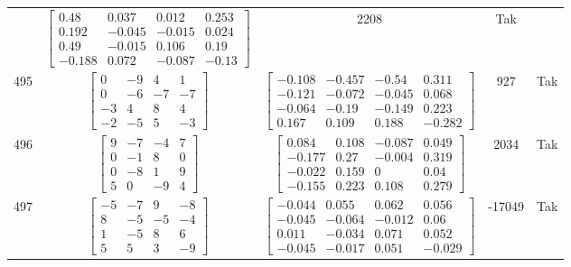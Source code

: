 \documentclass[a4paper,12pt]{article}
\begin{document}
\begin{tabular}{c c c c c}
&
$\begin{bmatrix} 0.48 & 0.037 & 0.012 & 0.253 \\ 0.192 & -0.045 & -0.015 & 0.024 \\ 0.49 & -0.015 & 0.106 & 0.19 \\ -0.188 & 0.072 & -0.087 & -0.13 \end{bmatrix}$
&
2208
&
Tak
\\
495
&
$\begin{bmatrix} 0 & -9 & 4 & 1 \\ 0 & -6 & -7 & -7 \\ -3 & 4 & 8 & 4 \\ -2 & -5 & 5 & -3 \end{bmatrix}$
&
$\begin{bmatrix} -0.108 & -0.457 & -0.54 & 0.311 \\ -0.121 & -0.072 & -0.045 & 0.068 \\ -0.064 & -0.19 & -0.149 & 0.223 \\ 0.167 & 0.109 & 0.188 & -0.282 \end{bmatrix}$
&
927
&
Tak
\\
496
&
$\begin{bmatrix} 9 & -7 & -4 & 7 \\ 0 & -1 & 8 & 0 \\ 0 & -8 & 1 & 9 \\ 5 & 0 & -9 & 4 \end{bmatrix}$
&
$\begin{bmatrix} 0.084 & 0.108 & -0.087 & 0.049 \\ -0.177 & 0.27 & -0.004 & 0.319 \\ -0.022 & 0.159 & 0 & 0.04 \\ -0.155 & 0.223 & 0.108 & 0.279 \end{bmatrix}$
&
2034
&
Tak
\\
497
&
$\begin{bmatrix} -5 & -7 & 9 & -8 \\ 8 & -5 & -5 & -4 \\ 1 & -5 & 8 & 6 \\ 5 & 5 & 3 & -9 \end{bmatrix}$
&
$\begin{bmatrix} -0.044 & 0.055 & 0.062 & 0.056 \\ -0.045 & -0.064 & -0.012 & 0.06 \\ 0.011 & -0.034 & 0.071 & 0.052 \\ -0.045 & -0.017 & 0.051 & -0.029 \end{bmatrix}$
&
-17049
&
Tak
\\

\end{tabular}
\end{document}
